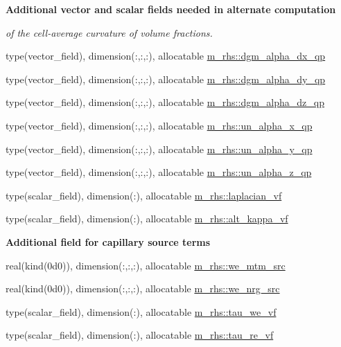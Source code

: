 \begin{Indent}\textbf{ Additional vector and scalar fields needed in alternate computation}\par
{\em of the cell-\/average curvature of volume fractions. }\begin{DoxyCompactItemize}
\item 
type(vector\+\_\+field), dimension(\+:,\+:,\+:), allocatable \hyperlink{namespacem__rhs_a1ecb03602517ea0c6a8594ac84d7baf6}{m\+\_\+rhs\+::dgm\+\_\+alpha\+\_\+dx\+\_\+qp}
\item 
type(vector\+\_\+field), dimension(\+:,\+:,\+:), allocatable \hyperlink{namespacem__rhs_ada84d050bc469e99491f0df609abae94}{m\+\_\+rhs\+::dgm\+\_\+alpha\+\_\+dy\+\_\+qp}
\item 
type(vector\+\_\+field), dimension(\+:,\+:,\+:), allocatable \hyperlink{namespacem__rhs_ade3320ea2b49d294014da588f54e09b4}{m\+\_\+rhs\+::dgm\+\_\+alpha\+\_\+dz\+\_\+qp}
\item 
type(vector\+\_\+field), dimension(\+:,\+:,\+:), allocatable \hyperlink{namespacem__rhs_a7b00376acfcaf5c7628428725986f223}{m\+\_\+rhs\+::un\+\_\+alpha\+\_\+x\+\_\+qp}
\item 
type(vector\+\_\+field), dimension(\+:,\+:,\+:), allocatable \hyperlink{namespacem__rhs_a2b0b138349cb9c896cb7985bdcedafe1}{m\+\_\+rhs\+::un\+\_\+alpha\+\_\+y\+\_\+qp}
\item 
type(vector\+\_\+field), dimension(\+:,\+:,\+:), allocatable \hyperlink{namespacem__rhs_aa0d0342fdf7c5d5f795c151fc10d1cee}{m\+\_\+rhs\+::un\+\_\+alpha\+\_\+z\+\_\+qp}
\item 
type(scalar\+\_\+field), dimension(\+:), allocatable \hyperlink{namespacem__rhs_aa2587a1fc99a23d4d7fe552602e72bbc}{m\+\_\+rhs\+::laplacian\+\_\+vf}
\item 
type(scalar\+\_\+field), dimension(\+:), allocatable \hyperlink{namespacem__rhs_adf9ba6fc1bd79727d1f7ce5fe7a302ed}{m\+\_\+rhs\+::alt\+\_\+kappa\+\_\+vf}
\end{DoxyCompactItemize}
\end{Indent}
\begin{Indent}\textbf{ Additional field for capillary source terms}\par
\begin{DoxyCompactItemize}
\item 
real(kind(0d0)), dimension(\+:,\+:,\+:), allocatable \hyperlink{namespacem__rhs_ace0c30f610f7a6b9e87eadd79e7197c0}{m\+\_\+rhs\+::we\+\_\+mtm\+\_\+src}
\item 
real(kind(0d0)), dimension(\+:,\+:,\+:), allocatable \hyperlink{namespacem__rhs_adf3ae8008dd304f908c21bc0f0fcb2ac}{m\+\_\+rhs\+::we\+\_\+nrg\+\_\+src}
\item 
type(scalar\+\_\+field), dimension(\+:), allocatable \hyperlink{namespacem__rhs_acc8e8d46f11ebb8f5c7389de8be28b60}{m\+\_\+rhs\+::tau\+\_\+we\+\_\+vf}
\item 
type(scalar\+\_\+field), dimension(\+:), allocatable \hyperlink{namespacem__rhs_a7e3b4d8f32649ff607c52440009f903f}{m\+\_\+rhs\+::tau\+\_\+re\+\_\+vf}
\end{DoxyCompactItemize}
\end{Indent}

